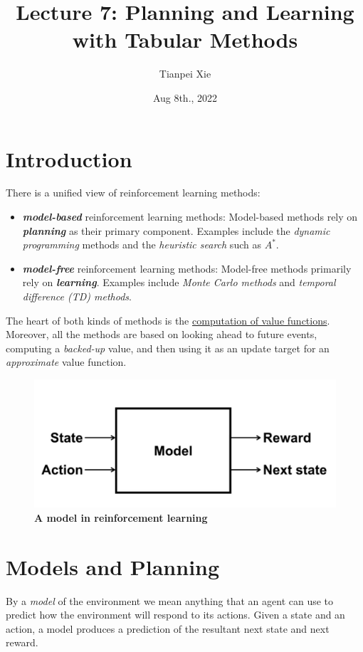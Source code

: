 \documentclass[11pt]{article}
\begin{document}
\title{Lecture 7: Planning and Learning with Tabular Methods}
\author{Tianpei Xie}
\date{ Aug 8th., 2022 }
\maketitle
\tableofcontents
\newpage
\section{Introduction}
There is a unified view of reinforcement learning methods:
\begin{itemize}
\item \emph{\textbf{model-based}} reinforcement learning methods: Model-based methods rely on \emph{\textbf{planning}} as their primary component. Examples include the \emph{dynamic programming} methods and the \emph{heuristic search} such as $A^*$.

\item \emph{\textbf{model-free}} reinforcement learning methods: Model-free methods primarily rely on \emph{\textbf{learning}}. Examples include \emph{Monte Carlo methods} and \emph{temporal difference (TD) methods}. 
\end{itemize}
The heart of both kinds of methods is the \underline{computation of value functions}. Moreover, all the methods are based on looking ahead to future events, computing a \emph{backed-up} value, and then using it as an update target for an \emph{approximate} value function.

\begin{figure}
\begin{minipage}[t]{1\linewidth}
  \centering
  \centerline{\includegraphics[scale = 0.3]{model_rl.png}}
\end{minipage}
\caption{\footnotesize{\textbf{A model in  reinforcement learning}}}
\label{fig: tabluar_methods_diagram}
\end{figure}
\section{Models and Planning}
By a \emph{model} of the environment we mean anything that an agent can use to predict how the environment will respond to its actions. Given a state and an action, a model produces a prediction of the resultant next state and next reward.
\end{document}
